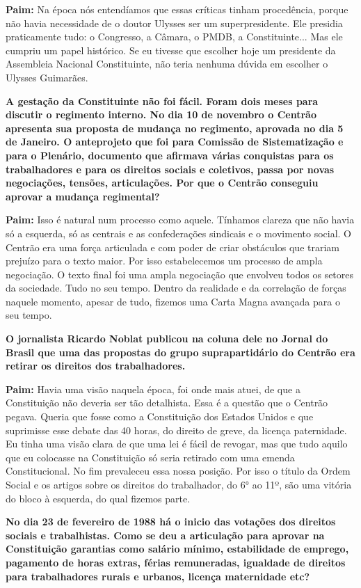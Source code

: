 \textbf{Paim:} Na época nós entendíamos que essas críticas tinham
procedência, porque não havia necessidade de o doutor Ulysses ser um
superpresidente. Ele presidia praticamente tudo: o Congresso, a Câmara,
o PMDB, a Constituinte... Mas ele cumpriu um papel histórico. Se eu
tivesse que escolher hoje um presidente da Assembleia Nacional
Constituinte, não teria nenhuma dúvida em escolher o Ulysses Guimarães.

\textbf{A gestação da Constituinte não foi fácil. Foram dois meses para
discutir o regimento interno. No dia 10 de novembro o Centrão apresenta
sua proposta de mudança no regimento, aprovada no dia 5 de Janeiro. O
anteprojeto que foi para Comissão de Sistematização e para o Plenário,
documento que afirmava várias conquistas para os trabalhadores e para os
direitos sociais e coletivos, passa por novas negociações, tensões,
articulações. Por que o Centrão conseguiu aprovar a mudança regimental?}

\textbf{Paim:} Isso é natural num processo como aquele. Tínhamos clareza
que não havia só a esquerda, só as centrais e as confederações sindicais
e o movimento social. O Centrão era uma força articulada e com poder de
criar obstáculos que trariam prejuízo para o texto maior. Por isso
estabelecemos um processo de ampla negociação. O texto final foi uma
ampla negociação que envolveu todos os setores da sociedade. Tudo no seu
tempo. Dentro da realidade e da correlação de forças naquele momento,
apesar de tudo, fizemos uma Carta Magna avançada para o seu tempo.

\textbf{O jornalista Ricardo Noblat publicou na coluna dele no Jornal do
Brasil que uma das propostas do grupo suprapartidário do Centrão era
retirar os direitos dos trabalhadores.}

\textbf{Paim:} Havia uma visão naquela época, foi onde mais atuei, de
que a Constituição não deveria ser tão detalhista. Essa é a questão que
o Centrão pegava. Queria que fosse como a Constituição dos Estados
Unidos e que suprimisse esse debate das 40 horas, do direito de greve,
da licença paternidade. Eu tinha uma visão clara de que uma lei é fácil
de revogar, mas que tudo aquilo que eu colocasse na Constituição só
seria retirado com uma emenda Constitucional. No fim prevaleceu essa
nossa posição. Por isso o título da Ordem Social e os artigos sobre os
direitos do trabalhador, do 6° ao 11º, são uma vitória do bloco à
esquerda, do qual fizemos parte.

\textbf{No dia 23 de fevereiro de 1988 há o inicio das votações dos
direitos sociais e trabalhistas. Como se deu a articulação para aprovar
na Constituição garantias como salário mínimo, estabilidade de emprego,
pagamento de horas extras, férias remuneradas, igualdade de direitos
para trabalhadores rurais e urbanos, licença maternidade etc?}

